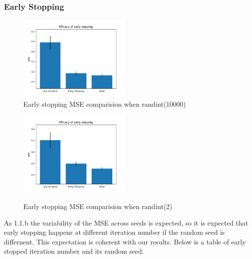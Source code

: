 \documentclass[a4paper]{article}
\begin{document}
\subsubsection{Early Stopping}
\begin{figure}[h]
  \begin{center}
    \includegraphics[width=0.5\textwidth]{ex_1_2_b.png}\\
    \caption{Early stopping MSE comparision when randint(10000)}
    \includegraphics[width=0.5\textwidth]{ex_1_2_b_rand2.png}\\
    \caption{Early stopping MSE comparision when randint(2)}
  \end{center}
\end{figure}
As 1.1.b the variability of the MSE across seeds is expected, so it is expected that
early stopping happens at different iteration number if the random seed is differnent.
This expectation is coherent with our results. Below is a table of early stopped
iteration number and its random seed.
\end{document}
